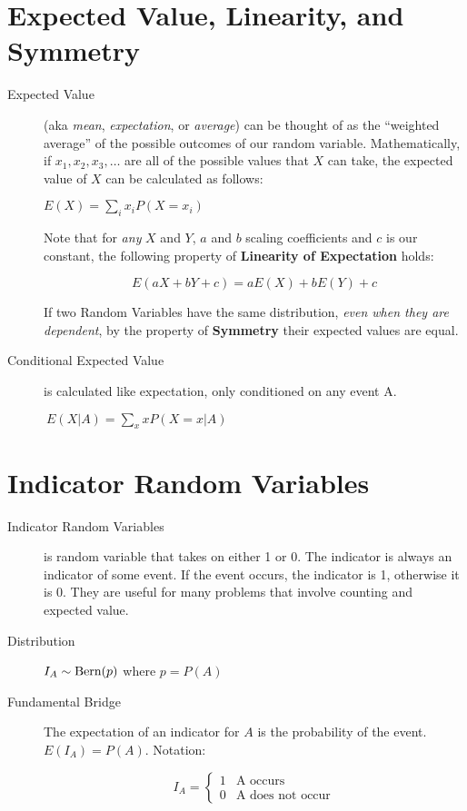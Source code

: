 \documentclass[11pt]{article}
\begin{document}
\section*{Expected Value, Linearity, and Symmetry}
\begin{description}
\item[Expected Value] (aka \emph{mean}, \emph{expectation}, or \emph{average}) can be thought of as the ``weighted average'' of the possible outcomes of our random variable. Mathematically, if $x_1, x_2, x_3, \dots$ are all of the possible values that $X$ can take, the expected value of $X$ can be calculated as follows:
\begin{center}
$E(X) = \sum\limits_{i}x_iP(X=x_i)$
\end{center}
Note that for \emph{any} $X$ and $Y$, $a$ and $b$ scaling coefficients and $c$ is our constant, the following property of \textbf{Linearity of Expectation} holds:

\[E(aX + bY + c) = aE(X) + bE(Y) + c \]

If two Random Variables have the same distribution, \emph{even when they are dependent}, by the property of \textbf{Symmetry} their expected values are equal.



\item[Conditional Expected Value] is calculated like expectation, only conditioned on any event A. \begin{center}
$\ E(X | A) = \sum\limits_{x}xP(X=x | A)$
\end{center}

\end{description}

\section*{Indicator Random Variables}
\begin{description}
\item[Indicator Random Variables] is random variable that takes on either 1 or 0. The indicator is always an indicator of some event. If the event occurs, the indicator is 1, otherwise it is 0. They are useful for many problems that involve counting and expected value.
\item[Distribution] $I_A \sim \textrm{Bern}(p)$ where $p = P(A)$
\item[Fundamental Bridge] The expectation of an indicator for $A$ is the probability of the event. $E(I_A) = P(A)$. Notation:

\[
I_A =
 \begin{cases}
   1 & \text{A occurs} \\
   0 & \text{A does not occur}
  \end{cases}
\]



\end{description}
\end{document}
